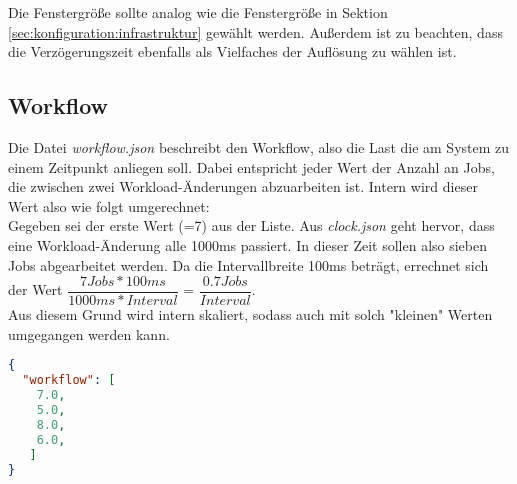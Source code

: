 Die Fenstergröße sollte analog wie die Fenstergröße in Sektion \ref{sec:konfiguration:infrastruktur} gewählt werden. Außerdem ist zu beachten, dass die Verzögerungszeit ebenfalls als Vielfaches der Auflösung zu wählen ist.

\subsection{Workflow}
Die Datei \textit{workflow.json} beschreibt den Workflow, also die Last die am System zu einem Zeitpunkt anliegen soll. Dabei entspricht jeder Wert der Anzahl an Jobs, die zwischen zwei Workload-Änderungen abzuarbeiten ist. Intern wird dieser Wert also wie folgt umgerechnet:\\
Gegeben sei der erste Wert (=7) aus der Liste. Aus \textit{clock.json} geht hervor, dass eine Workload-Änderung alle 1000ms passiert. In dieser Zeit sollen also sieben Jobs abgearbeitet werden. Da die Intervallbreite 100ms beträgt, errechnet sich der Wert $\dfrac{7 Jobs * 100ms}{1000ms * Interval}$ = $\dfrac{0.7Jobs}{Interval}$. \\

\vspace{0.2cm}
\noindent
Aus diesem Grund wird intern skaliert, sodass auch mit solch "kleinen" Werten umgegangen werden kann.


\begin{lstlisting}[language=json,firstnumber=1, caption={workflow.json}]
{
  "workflow": [
    7.0,
    5.0,
    8.0,
    6.0,
   ]
}
\end{lstlisting}




